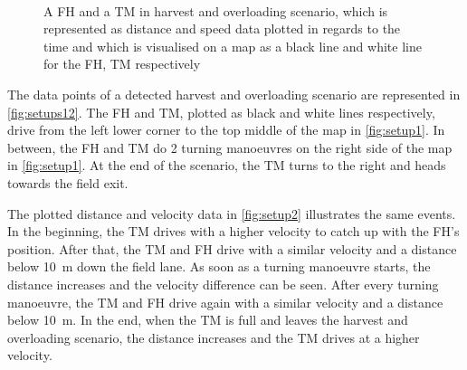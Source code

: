 \begin{figure}%
    \centering
   \\
    \caption{A \ac{FH} and a \ac{TM} in harvest and overloading scenario, which is represented as distance and speed data plotted in regards to the
   time and which is visualised on a map as a black line and white line for the \ac{FH}, \ac{TM} respectively}%
    \label{fig:setups12}%
\end{figure}

The data points of a detected harvest and overloading scenario are represented in \autoref{fig:setups12}.
The \ac{FH} and \ac{TM}, plotted as black and white lines respectively, drive from the left lower corner to the top middle of the map in \autoref{fig:setup1}.
In between, the \ac{FH} and \ac{TM} do \num{2} turning manoeuvres on the right side of the map in \autoref{fig:setup1}.
At the end of the scenario, the \ac{TM} turns to the right and heads towards the field exit.

The plotted distance and velocity data in \autoref{fig:setup2} illustrates the same events.
In the beginning, the \ac{TM} drives with a higher velocity to catch up with the \ac{FH}'s position.
After that, the \ac{TM} and \ac{FH} drive with a similar velocity and a distance below \SI{10}{\metre} down the field lane.
As soon as a turning manoeuvre starts, the distance increases and the velocity difference can be seen.
After every turning manoeuvre, the \ac{TM} and \ac{FH} drive again with a similar velocity and a distance below \SI{10}{\metre}.
In the end, when the \ac{TM} is full and leaves the harvest and overloading scenario, the distance increases and the \ac{TM} drives at a higher velocity.


